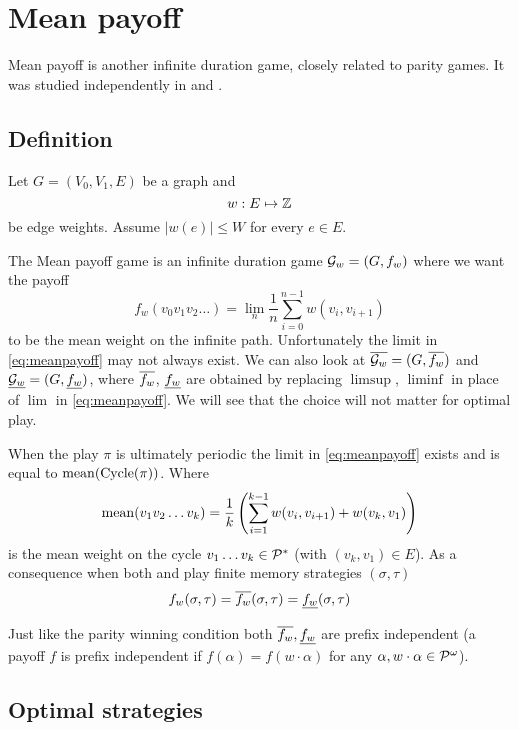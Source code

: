 \chapter{Mean payoff}
\label{chap:mean}

Mean payoff is another infinite duration game, closely related to parity games. It was studied independently in \cite{ehrenfeucht_positional_1979} and \cite{gurvich_cyclic_1988}.

\section{Definition}
Let $G=(V_0,V_1,E)$ be a graph and
\[
    w : E \mapsto \mathbb{Z}
\]
be edge weights. Assume $|w(e)| \leq W$ for every $e \in E$.

The Mean payoff game is an infinite duration game $\mathcal{G}_w=(G,f_w)$ where we want the payoff
\begin{equation}
    f_w (v_0v_1v_2 \ldots) = \lim_n \frac{1}{n} \sum_{i=0}^{n-1} w(v_i,v_{i+1}) \label{eq:meanpayoff}
\end{equation}
to be the mean weight on the infinite path. Unfortunately the limit in \eqref{eq:meanpayoff} may not always exist.
We can also look at $\overline{\mathcal{G}_w}=(G,\overline{f_w})$ and $\underline{\mathcal{G}_w}=(G,\underline{f_w})$, where $\overline{f_w}$, $\underline{f_w}$ are obtained by replacing $\limsup$, $\liminf$ in place of $\lim$ in \eqref{eq:meanpayoff}. We will see that the choice will not matter for optimal play.

When the play $\pi$ is ultimately periodic the limit in \eqref{eq:meanpayoff} exists and is equal to $\operatorname*{mean}(\operatorname{Cycle}(\pi))$. Where
\begin{equation}
    \operatorname*{mean}(v_1 v_2 \ldots v_k) = \frac{1}{k} \left( \sum_{i=1}^{k-1} w(v_i, v_{i+1}) + w(v_k, v_1) \right) \label{eq:mean}
\end{equation}
is the mean weight on the cycle $v_1 \ldots v_k \in \mathcal{P}^{*}$ (with $(v_k,v_1) \in E$).
As a consequence when both  and  play finite memory strategies $(\sigma,\tau)$
\[
    f_w(\sigma,\tau) = \overline{f_w}(\sigma,\tau) = \underline{f_w}(\sigma,\tau)
\]

Just like the parity winning condition both $\overline{f_w},\underline{f_w}$ are prefix independent (a payoff $f$ is prefix independent if $f(\alpha) = f(w \cdot \alpha)$ for any $\alpha, w \cdot \alpha \in \mathcal{P}^\omega$).

\section{Optimal strategies}

